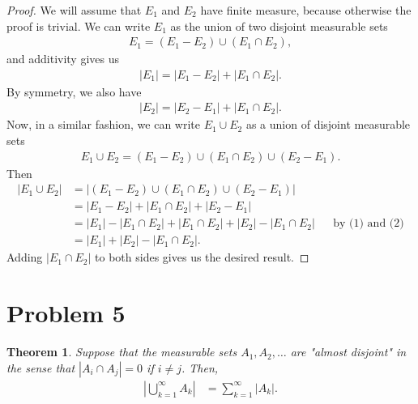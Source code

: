 \documentclass[10pt,a4paper]{article}
\theoremstyle{theorem}
\newtheorem{theorem}{Theorem}
\theoremstyle{definition}
\begin{document}
\begin{proof}
We will assume that $E_1$ and $E_2$ have finite measure, because otherwise the proof is trivial. We can write $E_1$ as the union of two disjoint measurable sets
\begin{align*}
E_1 = (E_1 - E_2) \cup (E_1 \cap E_2),
\end{align*}
and additivity gives us
\begin{align}
|E_1| = |E_1 - E_2| + |E_1 \cap E_2|.
\end{align}
By symmetry, we also have
\begin{align}
|E_2| = |E_2 - E_1| + |E_1 \cap E_2|.
\end{align}
Now, in a similar fashion, we can write $E_1 \cup E_2$ as a union of disjoint measurable sets
\begin{align*}
E_1 \cup E_2 = (E_1 - E_2) \cup (E_1 \cap E_2) \cup (E_2 - E_1).
\end{align*}
Then
\begin{align*}
|E_1 \cup E_2| &= |(E_1 - E_2) \cup (E_1 \cap E_2) \cup (E_2 - E_1)|\\
&= |E_1 - E_2| + |E_1 \cap E_2| + |E_2 - E_1|\\
&= |E_1| - |E_1 \cap E_2| + |E_1 \cap E_2| + |E_2| - |E_1 \cap E_2| &&\text{by (1) and (2)}\\
&= |E_1| + |E_2| - |E_1 \cap E_2| .
\end{align*}
Adding $|E_1 \cap E_2|$ to both sides gives us the desired result. 
\end{proof}

\section*{Problem 5}
\begin{theorem}
Suppose that the measurable sets $A_1, A_2, \dotsc$ are "almost disjoint" in the sense that $|A_i \cap A_j| = 0$ if $ i \not = j$. Then,
\begin{align*}
\left| \bigcup_{k=1}^\infty A_k \right| &= \sum_{k=1}^\infty |A_k|.
\end{align*}
\end{theorem}
\end{document}
